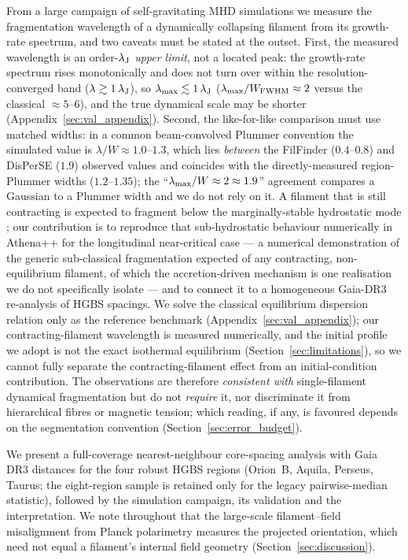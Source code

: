 \documentclass[usenatbib,twoside,twocolumn]{mnras}
\begin{document}
From a large campaign of self-gravitating MHD simulations we measure the fragmentation wavelength of a dynamically collapsing filament from its growth-rate spectrum, and two caveats must be stated at the outset. First, the measured wavelength is an order-$\lambda_{\rm J}$ \emph{upper limit}, not a located peak: the growth-rate spectrum rises monotonically and does not turn over within the resolution-converged band ($\lambda\gtrsim1\,\lambda_{\rm J}$), so $\lambda_{\rm max}\lesssim1\,\lambda_{\rm J}$ ($\lambda_{\rm max}/W_{\rm FWHM}\approx2$ versus the classical $\approx5$--$6$), and the true dynamical scale may be shorter (Appendix~\ref{sec:val_appendix}). Second, the like-for-like comparison must use matched widths: in a common beam-convolved Plummer convention the simulated value is $\lambda/W\approx1.0$--$1.3$, which lies \emph{between} the FilFinder ($0.4$--$0.8$) and DisPerSE ($1.9$) observed values and coincides with the directly-measured region-Plummer widths ($1.2$--$1.35$); the ``$\lambda_{\rm max}/W\approx2\approx1.9$'' agreement compares a Gaussian to a Plummer width and we do not rely on it. A filament that is still contracting is expected to fragment below the marginally-stable hydrostatic mode \citep{Clarke2016,Clarke2017}; our contribution is to reproduce that sub-hydrostatic behaviour numerically in Athena++ for the longitudinal near-critical case --- a numerical demonstration of the generic sub-classical fragmentation expected of any contracting, non-equilibrium filament, of which the accretion-driven \citet{Clarke2016,Clarke2017} mechanism is one realisation we do not specifically isolate --- and to connect it to a homogeneous Gaia-DR3 re-analysis of HGBS spacings. We solve the classical equilibrium dispersion relation only as the reference benchmark (Appendix~\ref{sec:val_appendix}); our contracting-filament wavelength is measured numerically, and the initial profile we adopt is not the exact isothermal equilibrium (Section~\ref{sec:limitations}), so we cannot fully separate the contracting-filament effect from an initial-condition contribution. The observations are therefore \emph{consistent with} single-filament dynamical fragmentation but do not \emph{require} it, nor discriminate it from hierarchical fibres or magnetic tension; which reading, if any, is favoured depends on the segmentation convention (Section~\ref{sec:error_budget}).

We present a full-coverage nearest-neighbour core-spacing analysis with Gaia DR3 distances \citep{Zhang2023} for the four robust HGBS regions (Orion~B, Aquila, Perseus, Taurus; the eight-region sample is retained only for the legacy pairwise-median statistic), followed by the simulation campaign, its validation and the interpretation. We note throughout that the large-scale filament--field misalignment from Planck polarimetry \citep{Planck2016} measures the projected orientation, which need not equal a filament's internal field geometry (Section~\ref{sec:discussion}).
\end{document}
